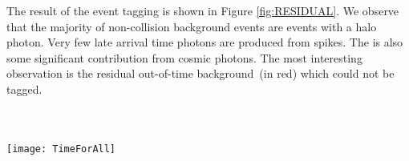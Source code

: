 \vspace{5mm}
The result of the event tagging is shown in Figure \ref{fig:RESIDUAL}. We observe that the majority of non-collision background events are events with a halo photon. Very few late arrival time photons are produced from spikes. The is also some significant contribution from cosmic photons. The most interesting observation is the residual out-of-time background~(in red) which could not be tagged. 

\paragraph*{}\mbox{}\\
\begin{minipage}{0.90\linewidth} 
\begin{center}
  \captionsetup{type=figure}
   \texttt{[image: TimeForAll]}
   \label{fig:RESIDUAL}
\end{center}
\end{minipage}

